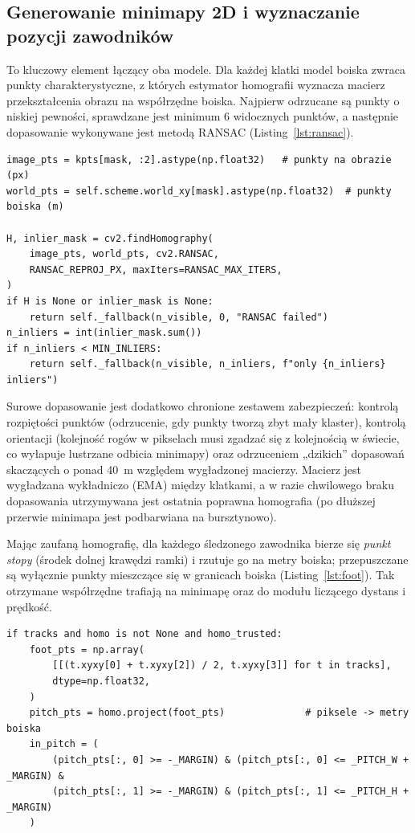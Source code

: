 \documentclass[11pt,a4paper]{article}
\begin{document}
\subsection{Generowanie minimapy 2D i wyznaczanie pozycji zawodników}
\label{sec:minimap}

To kluczowy element łączący oba modele. Dla każdej klatki model boiska zwraca
punkty charakterystyczne, z których estymator homografii wyznacza macierz
przekształcenia obrazu na współrzędne boiska. Najpierw odrzucane są punkty o
niskiej pewności, sprawdzane jest minimum 6 widocznych punktów, a następnie
dopasowanie wykonywane jest metodą RANSAC (Listing~\ref{lst:ransac}).

\begin{lstlisting}[style=py,caption={Rdzeń dopasowania homografii -- \texttt{pitch/dynamic\_homography.py}},label={lst:ransac}]
image_pts = kpts[mask, :2].astype(np.float32)   # punkty na obrazie (px)
world_pts = self.scheme.world_xy[mask].astype(np.float32)  # punkty boiska (m)

H, inlier_mask = cv2.findHomography(
    image_pts, world_pts, cv2.RANSAC,
    RANSAC_REPROJ_PX, maxIters=RANSAC_MAX_ITERS,
)
if H is None or inlier_mask is None:
    return self._fallback(n_visible, 0, "RANSAC failed")
n_inliers = int(inlier_mask.sum())
if n_inliers < MIN_INLIERS:
    return self._fallback(n_visible, n_inliers, f"only {n_inliers} inliers")
\end{lstlisting}

Surowe dopasowanie jest dodatkowo chronione zestawem zabezpieczeń: kontrolą
rozpiętości punktów (odrzucenie, gdy punkty tworzą zbyt mały klaster), kontrolą
orientacji (kolejność rogów w pikselach musi zgadzać się z kolejnością w
świecie, co wyłapuje lustrzane odbicia minimapy) oraz odrzuceniem „dzikich”
dopasowań skaczących o ponad 40~m względem wygładzonej macierzy. Macierz jest
wygładzana wykładniczo (EMA) między klatkami, a w razie chwilowego braku
dopasowania utrzymywana jest ostatnia poprawna homografia (po dłuższej przerwie
minimapa jest podbarwiana na bursztynowo).

Mając zaufaną homografię, dla każdego śledzonego zawodnika bierze się
\emph{punkt stopy} (środek dolnej krawędzi ramki) i rzutuje go na metry boiska;
przepuszczane są wyłącznie punkty mieszczące się w granicach boiska
(Listing~\ref{lst:foot}). Tak otrzymane współrzędne trafiają na minimapę oraz do
modułu liczącego dystans i prędkość.

\begin{lstlisting}[style=py,caption={Rzutowanie pozycji zawodników na boisko -- \texttt{pipeline/live.py}},label={lst:foot}]
if tracks and homo is not None and homo_trusted:
    foot_pts = np.array(
        [[(t.xyxy[0] + t.xyxy[2]) / 2, t.xyxy[3]] for t in tracks],
        dtype=np.float32,
    )
    pitch_pts = homo.project(foot_pts)              # piksele -> metry boiska
    in_pitch = (
        (pitch_pts[:, 0] >= -_MARGIN) & (pitch_pts[:, 0] <= _PITCH_W + _MARGIN) &
        (pitch_pts[:, 1] >= -_MARGIN) & (pitch_pts[:, 1] <= _PITCH_H + _MARGIN)
    )
\end{lstlisting}
\end{document}
